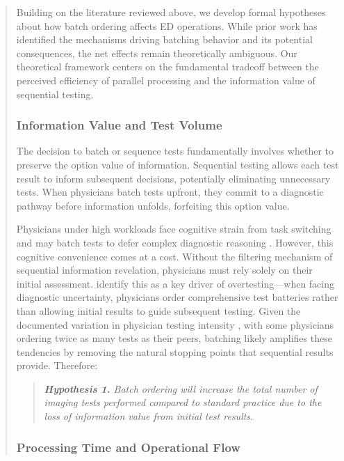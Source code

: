 \documentclass[11pt]{article}
\newcommand{\1}{\hbox{\rm 1\kern-.35em 1}}
\begin{document}
{\begin{quote}
Building on the literature reviewed above, we develop formal hypotheses about how batch ordering affects ED operations. While prior work has identified the mechanisms driving batching behavior and its potential consequences, the net effects remain theoretically ambiguous. Our theoretical framework centers on the fundamental tradeoff between the perceived efficiency of parallel processing and the information value of sequential testing.

\subsubsection*{Information Value and Test Volume}

The decision to batch or sequence tests fundamentally involves whether to preserve the option value of information. Sequential testing allows each test result to inform subsequent decisions, potentially eliminating unnecessary tests. When physicians batch tests upfront, they commit to a diagnostic pathway before information unfolds, forfeiting this option value.

Physicians under high workloads face cognitive strain from task switching and may batch tests to defer complex diagnostic reasoning \cite{kc2013does, skaugset2016can}. However, this cognitive convenience comes at a cost. Without the filtering mechanism of sequential information revelation, physicians must rely solely on their initial assessment. \cite{lam2020why} identify this as a key driver of overtesting---when facing diagnostic uncertainty, physicians order comprehensive test batteries rather than allowing initial results to guide subsequent testing. Given the documented variation in physician testing intensity \cite{hodgson2018are}, with some physicians ordering twice as many tests as their peers, batching likely amplifies these tendencies by removing the natural stopping points that sequential results provide. Therefore:

\begin{quote}
\small
\textit{\textbf{Hypothesis 1.} Batch ordering will increase the total number of imaging tests performed compared to standard practice due to the loss of information value from initial test results.}
\end{quote}

\subsubsection*{Processing Time and Operational Flow}


\end{quote}}
\end{document}
